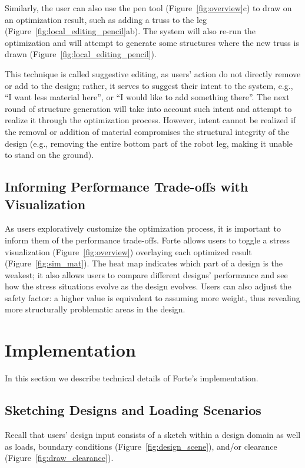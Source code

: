 Similarly, the user can also use the pen tool (Figure~\ref{fig:overview}c) to draw on an optimization result, such as adding a truss to the leg (Figure~\ref{fig:local_editing_pencil}ab). The system will also re-run the optimization and will attempt to generate some structures where the new truss is drawn (Figure~\ref{fig:local_editing_pencil}).

This technique is called suggestive editing, as users' action do not directly remove or add to the design; rather, it serves to suggest their intent to the system, e.g., ``I want less material here'', or ``I would like to add something there''. The next round of structure generation will take into account such intent and attempt to realize it through the optimization process. However, intent cannot be realized if the removal or addition of material compromises the structural integrity of the design (e.g., removing the entire bottom part of the robot leg, making it unable to stand on the ground).

\subsection{Informing Performance Trade-offs with Visualization}
As users exploratively customize the optimization process, it is important to inform them of the performance trade-offs. Forte allows users to toggle a stress visualization (Figure~\ref{fig:overview}) overlaying each optimized result (Figure~\ref{fig:sim_mat}). The heat map indicates which part of a design is the weakest; it also allows users to compare different designs' performance and see how the stress situations evolve as the design evolves. Users can also adjust the safety factor: a higher value is equivalent to assuming more weight, thus revealing more structurally problematic areas in the design.
 

\section{Implementation}
In this section we describe technical details of Forte's implementation. 

\subsection{Sketching Designs and Loading Scenarios}
Recall that users' design input consists of a sketch within a design domain as well as loads, boundary conditions (Figure~\ref{fig:design_scene}), and/or clearance (Figure~\ref{fig:draw_clearance}).


